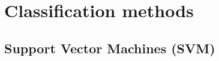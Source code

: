 \documentclass[main.tex]{subfiles}
\begin{document}
\section{Classification methods}

\subsection{Support Vector Machines (SVM)}
\end{document}
